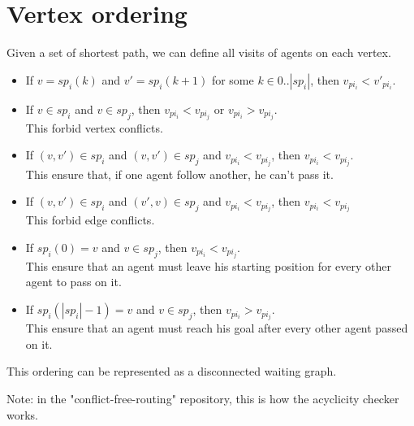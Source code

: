 \section{Vertex ordering}\label{sec:background}

Given a set of shortest path, we can define all visits of agents on each vertex.

\begin{itemize}
  \item If $v = sp_i(k)$ and $v' = sp_i(k+1)$ for some $k \in 0..|sp_i|$, then $v_{pi_i}<v'_{pi_i}$.
  \item If $v \in sp_i$ and $v \in sp_j$, then $v_{pi_i}<v_{pi_j}$ or $v_{pi_i}>v_{pi_j}$.
  \\ This forbid vertex conflicts.
  \item If $(v,v') \in sp_i$ and $(v,v') \in sp_j$ and $v_{pi_i} < v_{pi_j}$, then $v_{pi_i} < v_{pi_j}$. \\ This ensure that, if one agent follow another, he can't pass it.
  \item If $(v,v') \in sp_i$ and $(v',v) \in sp_j$ and $v_{pi_i} < v_{pi_j}$, then $v_{pi_i} < v_{pi_j}$ \\ This forbid edge conflicts.
  \item If $sp_i(0)=v$ and $v \in sp_j$, then $v_{pi_i} < v_{pi_j}$. \\ This ensure that an agent must leave his starting position for every other agent to pass on it.
  \item If $sp_i(|sp_i|-1)=v$ and $v \in sp_j$, then $v_{pi_i} > v_{pi_j}$. \\ This ensure that an agent must reach his goal after every other agent passed on it.
\end{itemize}

This ordering can be represented as a disconnected waiting graph.

Note: in the "conflict-free-routing" repository, this is how the acyclicity checker works.
